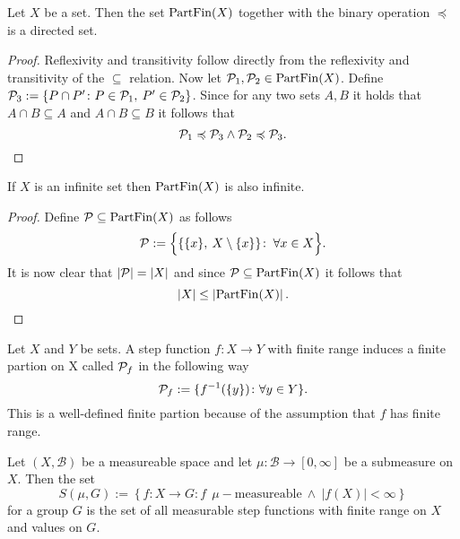 \begin{thm}\label{thm:algdirected}
  Let $X$ be a set. Then the set ${\rm PartFin}(X)$ together with the binary operation $\preccurlyeq$ is a directed set.
\end{thm}

\begin{proof}
  Reflexivity and transitivity follow directly from the reflexivity and transitivity of the $\subseteq$ relation.
  Now let $\P_1, \P_2 \in {\rm PartFin}(X)$. Define $\P_3 := \{ P \cap P' \colon P \in \P_1, \:P' \in \P_2 \}$.
  Since for any two sets $A, B$ it holds that $A \cap B \subseteq A$ and $A \cap B \subseteq B$ it follows that
  \begin{equation*}
    \P_1 \preccurlyeq \P_3 \land \P_2 \preccurlyeq \P_3.
  \end{equation*}
\end{proof}

\begin{rem}\label{rem:partfinsze}
  If $X$ is an infinite set then ${\rm PartFin}(X)$ is also infinite.
\end{rem}

\begin{proof}
  Define $\P \subseteq {\rm PartFin}(X)$ as follows
  \begin{equation*}
    \P := \Big\{ \{ \{x\}, \: X\setminus\{x\}\}\colon \: \forall x \in X \Big\}.
  \end{equation*}
  It is now clear that $\left| \P \right| = \left| X \right|$ and since $\P \subseteq {\rm PartFin}(X)$ it follows that 
  \begin{equation*}
    \left| X \right| \leq \left| {\rm PartFin}(X) \right|.
  \end{equation*}
\end{proof}

\begin{defin}
  Let $X$ and $Y$ be sets. A step function $f\colon X \to Y$ with finite range induces a finite partion on X called $\P_f$ in the following way
  \begin{equation*}
    \P_f := \{f^{-1}(\{y\})\colon \forall y \in Y\}.
  \end{equation*}
  This is a well-defined finite partion because of the assumption that $f$ has finite range.
\end{defin}

\begin{defin}
  Let $(X, \mathcal{B})$ be a measureable space and let $\mu\colon \mathcal{B} \to [0, \infty]$ be a submeasure on $X$. Then the set
  \begin{equation*}
    S(\mu, G) := \left\{ f: X \to G\colon f \:\:\mu-\text{measureable} \: \land \: \left| f(X) \right| < \infty \right\}
  \end{equation*}
  for a group $G$ is the set of all measurable step functions with finite range on $X$ and values on $G$.
\end{defin}

